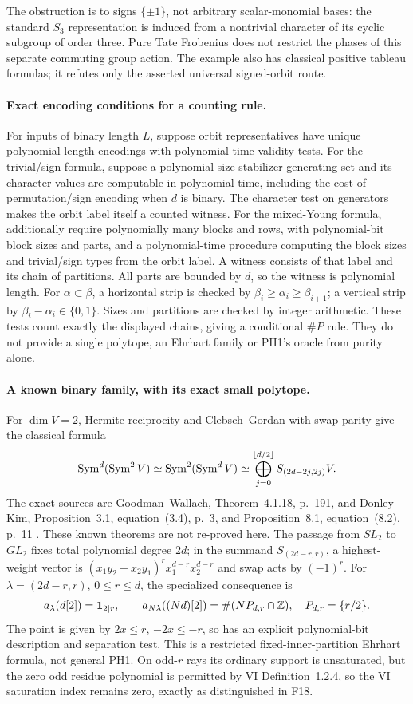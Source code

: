\documentclass[11pt,a4paper]{article}
\newcommand{\fid}[1]{\textsf{#1}}\newcommand{\gate}[1]{\textsf{#1}}
\theoremstyle{named}\newtheorem{finding}{Finding}[section]
\theoremstyle{definition}\newtheorem{definition}[finding]{Definition}
\theoremstyle{remark}\newtheorem{remark}[finding]{Remark}
\begin{document}
The obstruction is to signs $\{\pm1\}$, not arbitrary scalar-monomial
bases: the standard $S_3$ representation is induced from a nontrivial
character of its cyclic subgroup of order three. Pure Tate Frobenius
does not restrict the phases of this separate commuting group action.
The example also has classical positive tableau formulas; it refutes
only the asserted universal signed-orbit route.

\paragraph{Exact encoding conditions for a counting rule.}
For inputs of binary length $L$, suppose orbit representatives have
unique polynomial-length encodings with polynomial-time validity tests.
For the trivial/sign formula, suppose a polynomial-size stabilizer
generating set and its character values are computable in polynomial
time, including the cost of permutation/sign encoding when $d$ is
binary. The character test on generators makes the orbit label itself
a counted witness. For the mixed-Young formula, additionally require
polynomially many blocks and rows, with polynomial-bit block sizes and
parts, and a polynomial-time procedure computing the block sizes and
trivial/sign types from the orbit label. A witness consists of that label
and its chain of partitions.
All parts are bounded by $d$, so the witness is polynomial length.
For $\alpha\subset\beta$, a horizontal strip is checked by
$\beta_i\ge\alpha_i\ge\beta_{i+1}$; a vertical strip by
$\beta_i-\alpha_i\in\{0,1\}$. Sizes and partitions are checked by
integer arithmetic. These tests count exactly the displayed chains,
giving a conditional \(\#P\) rule. They do not provide a single
polytope, an Ehrhart family or PH1's oracle from purity alone.

\paragraph{A known binary family, with its exact small polytope.}
For $\dim V=2$, Hermite reciprocity and Clebsch--Gordan with swap parity
give the classical formula
\[
 \operatorname{Sym}^d(\operatorname{Sym}^2 V)\simeq\operatorname{Sym}^2(\operatorname{Sym}^dV)
       \simeq\bigoplus_{j=0}^{\lfloor d/2\rfloor}S_{(2d-2j,2j)}V.
\]
The exact sources are Goodman--Wallach, Theorem~4.1.18, p.~191,
and Donley--Kim, Proposition~3.1, equation~(3.4), p.~3, and
Proposition~8.1, equation~(8.2), p.~11 \cite{GW,DK}.
These known theorems are not re-proved here. The passage from $SL_2$
to $GL_2$ fixes total polynomial degree $2d$; in the summand
$S_{(2d-r,r)}$, a highest-weight vector is
$(x_1y_2-x_2y_1)^r x_1^{d-r}x_2^{d-r}$ and swap acts by $(-1)^r$.
For $\lambda=(2d-r,r)$, $0\le r\le d$, the specialized consequence is
\[
 a_\lambda(d[2])=\mathbf1_{2\mid r},\qquad
 a_{N\lambda}((Nd)[2])
 =\#(N P_{d,r}\cap\mathbb Z),\quad P_{d,r}=\{r/2\}.
\]
The point is given by $2x\le r$, $-2x\le-r$, so has an explicit
polynomial-bit description and separation test. This is a restricted
fixed-inner-partition Ehrhart formula, not general PH1. On odd-$r$
rays its ordinary support is unsaturated, but the zero odd residue
polynomial is permitted by VI Definition~1.2.4, so the VI saturation
index remains zero, exactly as distinguished in \fid{F18}.
\end{document}

